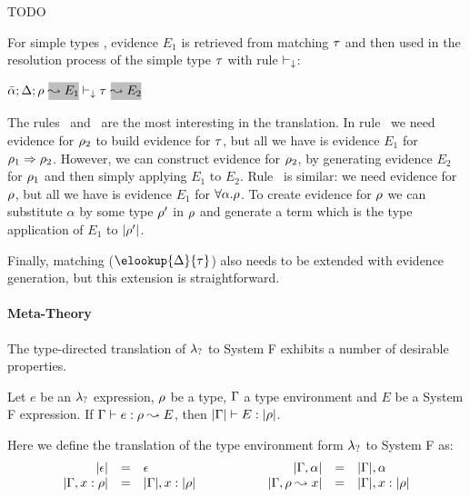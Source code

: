 TODO

For simple types , evidence $E_1$ is retrieved from matching 
$\tau$ and then used in the resolution process of the simple type 
$\tau$ with rule $\vdash_\downarrow$:

\begin{center}
$\bar{\alpha};\env; \rulet~\gbox{\leadsto E_1} \turns_\downarrow \type~\gbox{\leadsto E_2}$
\end{center}

The rules ~and ~are the most interesting in the translation. 
In rule ~we need evidence for $\rho_2$ to build evidence for $\tau$, 
but all we have is evidence $E_1$ for $\rho_1 \Rightarrow \rho_2$. However, we can 
construct evidence for $\rho_2$, by generating evidence $E_2$ for $\rho_1$
and then simply applying $E_1$ to $E_2$. Rule ~is similar: we need 
evidence for $\rho$, but all we have is evidence $E_1$ for $\forall \alpha. \rho$. 
To create evidence for $\rho$ we can substitute $\alpha$ by some type 
$\rho'$ in $\rho$ and generate a term which is the type application of 
$E_1$ to $|\rho'|$. 

Finally, matching ($\elookup{\env}{\type}$) also needs to be
extended with evidence generation, but this extension is
straightforward.

\paragraph{Meta-Theory} The type-directed translation of $\lambda_{?}$ to System F exhibits a number
of desirable properties.

\begin{theorem}\label{thm:type:preservation} Let $e$ be an $\lambda_{?}$
  expression, $\rho$ be a type, $\Gamma$ a type environment and $E$ be a System F expression. If
  $\Gamma \vdash e:\rho \leadsto E$, then $|\Gamma| \vdash E:|\rho|$.
\end{theorem}
Here we define the translation of the type environment form $\lambda_{?}$ to System F as:
\begin{equation*}
\begin{array}{rcl@{\hspace{2cm}}rcl}
|\epsilon| & = & \epsilon & |\tenv,\alpha| & = & |\tenv|, \alpha \\
|\tenv,x : \rulet| & = & |\tenv|, x : |\rulet| &
|\tenv, \rulet \leadsto x| & = & |\tenv|, x : |\rulet|
\end{array}
\end{equation*}

